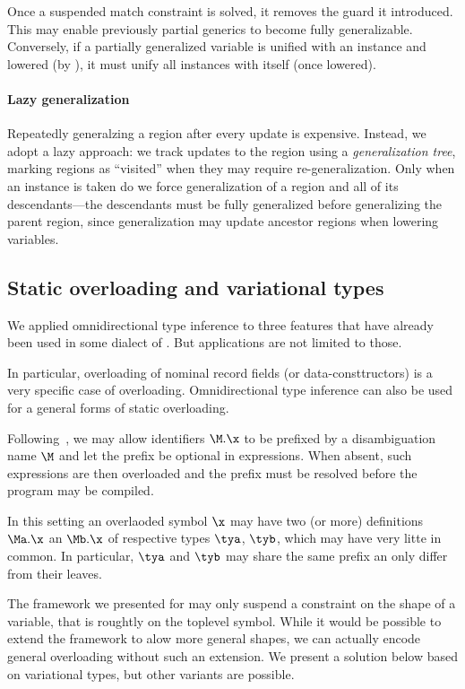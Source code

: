 \documentclass[acmsmall,screen,nonacm,review]{acmart}
\begin{document}
Once a suspended match constraint is solved, it removes the guard it
introduced. This may enable previously partial generics to become fully
generalizable. Conversely, if a partially generalized variable is unified with
an instance and lowered (\eg by ), it must unify all
instances with itself (once lowered).


\paragraph{Lazy generalization}

Repeatedly generalzing a region after every update is expensive.
Instead, we adopt a lazy approach: we track updates to the region using
a \emph{generalization tree}, marking regions as ``visited'' when they may
require re-generalization. Only when an instance is taken do we
force generalization of a region and all of its descendants---the descendants
must be fully generalized before generalizing the parent region, since
generalization may update ancestor regions when lowering variables.


\subsection{Static overloading and variational types}

We applied omnidirectional type inference to three features that have
already been used in some dialect of \ML.  But applications are not limited
to those.

In particular, overloading of nominal record fields (or data-consttructors)
is a very specific case of overloading.  Omnidirectional type inference can
also be used for a general forms of static overloading.

Following~\cite{Leijen-Ye/prefix@pldi2025},
we may allow identifiers $\M.\x$ to be prefixed by a
disambiguation name $\M$ and let the prefix be optional in expressions.
When absent, such expressions are then overloaded and the prefix must be
resolved before the program may be compiled.

In this setting an overlaoded symbol $\x$ may have two (or more) definitions
$\Ma.\x$ an $\Mb.\x$ of respective types $\tya$, $\tyb$, which may have very
litte in common. In particular, $\tya$ and $\tyb$ may share the same prefix
an only differ from their leaves.

The framework we presented for \OML may only suspend a constraint on the
shape of a variable, that is roughtly on the toplevel symbol.  While it
would be possible to extend the framework to alow more general shapes, we
can actually encode general overloading without such an extension.
We present a solution below based on variational types, but other variants
are possible.
\end{document}
